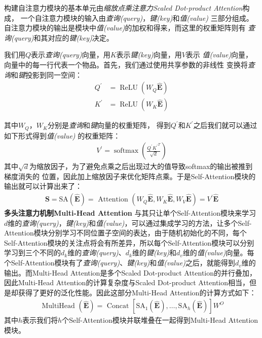 构建自注意力模块的基本单元由\textit{缩放点乘注意力Scaled Dot-product Attention}构成，%
一个自注意力模块的输入由\textit{查询(query)}，\textit{键(key)}和\textit{值(value)}%
三部分组成。自注意力模块的输出是模块中\textit{值(value)}的加权和得来，而这里的权重矩阵则有%
\textit{查询(query)}和其对应的\textit{键(key)}决定。

我们用$Q$表示\textit{查询(query)}向量，用$K$表示\textit{键(key)}向量，用$V$表示%
\textit{值(value)}向量，向量中的每一行代表一个物品。首先，我们通过使用共享参数的非线性%
变换将\textit{查询}和\textit{键}投影到同一空间：
\begin{align} 
	Q^{\prime} &=\operatorname{ReLU}(W_{Q}\widehat{\mathbf{E}}) \\ 
	K^{\prime} &=\operatorname{ReLU}(W_{K}\widehat{\mathbf{E}})
\end{align}

其中$W_{Q}$，$W_{K}$分别是\textit{查询}和\textit{键}向量的权重矩阵，%
得到$Q^{\prime}$和$K^{\prime}$之后我们就可以通过如下形式得到\textit{值(value)}%
的权重矩阵：
\begin{align} 
	V^{\prime}=\operatorname{softmax}(\frac{Q^{\prime} {K^{\prime}}^{T}}{\sqrt{d}})
\end{align}
其中$\sqrt{d}$为缩放因子，为了避免点乘之后出现过大的值导致softmax的输出被推到梯度消失的%
位置，因此加上缩放因子来优化矩阵点乘。于是Self-Attention模块的输出就可以计算出来了：
\begin{align} 
	\mathbf{S}=\mathrm{SA}(\widehat{\mathbf{E}})=\text { Attention }(W_{Q}\widehat{\mathbf{E}}, W_{K}\widehat{\mathbf{E}}, W_{V}\widehat{\mathbf{E}}) = V^{\prime}\widehat{\mathbf{E}}
\end{align}
\textbf{多头注意力机制Multi-Head Attention}
与其只让单个Self-Attention模块来学习$d$维的\textit{查询(query)}，\textit{键(key)}和\textit{值(value)}，可以通过集成学习的方法，让多个Self-Attention模块分别学习不同位置子空间的表达，由于随机初始化的不同，每个Self-Attention模块的关注点将会有所差异，所以每个Self-Attention模块可以分别学习到三个不同的$d_{k}$维的\textit{查询(query)}、$d_{k}$维的\textit{键(key)}和$d_{v}$维的\textit{值(value)}向量。每个Self-Attention模块有了\textit{查询(query)}、\textit{键(key)}和\textit{值(value)}之后，就能得到$d_{v}$维的输出。而Multi-Head Attention是多个Scaled Dot-product Attention的并行叠加，因此Multi-Head Attention的计算复杂度与Scaled Dot-product Attention相当，但是却获得了更好的泛化性能。因此这部分Multi-Head Attention的计算方式如下：
\begin{align} 
	\text { MultiHead }(\widehat{\mathbf{E}}) =\text { Concat }[\mathrm{SA}_{1}(\widehat{\mathbf{E}}), \ldots, \mathrm{SA}_{h}(\widehat{\mathbf{E}})] W^{O}
\end{align}
其中$h$表示我们将$h$个Self-Attention模块并联堆叠在一起得到Multi-Head Attention模块。


